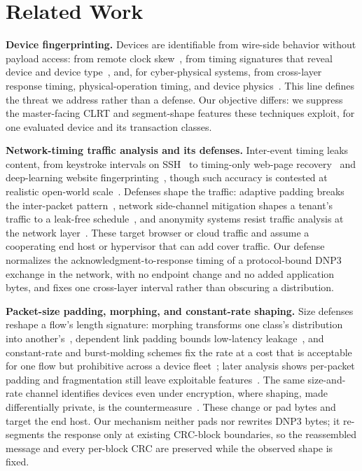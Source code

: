 \section{Related Work}
\label{sec:related}

\noindent\textbf{Device fingerprinting.} Devices are identifiable from wire-side behavior without
payload access: from remote clock skew~\cite{kohno2005}, from timing signatures that reveal device and
device type~\cite{gtid2015}, and, for cyber-physical systems, from cross-layer response timing,
physical-operation timing, and device physics~\cite{formby2016,gu2018}. This line defines the threat
we address rather than a defense. Our objective differs: we suppress the master-facing CLRT and
segment-shape features these techniques exploit, for one evaluated device and its transaction classes.

\noindent\textbf{Network-timing traffic analysis and its defenses.} Inter-event timing leaks content,
from keystroke intervals on SSH~\cite{song2001} to timing-only web-page recovery~\cite{feghhi2016} and
deep-learning website fingerprinting~\cite{sirinam2018}, though such accuracy is contested at realistic
open-world scale~\cite{panchenko2016}. Defenses shape the traffic: adaptive padding breaks the
inter-packet pattern~\cite{juarez2016}, network side-channel mitigation shapes a tenant's
traffic to a leak-free schedule~\cite{pacer2022}, and anonymity systems resist traffic analysis at the
network layer~\cite{hornet2015,taranet2018}. These target browser or cloud traffic and assume a
cooperating end host or hypervisor that can add cover traffic. Our defense normalizes the
acknowledgment-to-response timing of a protocol-bound DNP3 exchange in the network, with no endpoint
change and no added application bytes, and fixes one cross-layer interval rather than obscuring a
distribution.

\noindent\textbf{Packet-size padding, morphing, and constant-rate shaping.} Size defenses reshape a
flow's length signature: morphing transforms one class's distribution into another's~\cite{wright2009},
dependent link padding bounds low-latency leakage~\cite{wang2008dlp}, and constant-rate and
burst-molding schemes fix the rate at a cost that is acceptable for one flow but prohibitive across a
device fleet~\cite{tamaraw2014,walkietalkie2017}; later analysis shows per-packet padding and
fragmentation still leave exploitable features~\cite{dyer2012}. The same size-and-rate channel
identifies devices even under encryption, where shaping, made differentially private, is the
countermeasure~\cite{apthorpe2019,netshaper2024}. These change or pad bytes and target the end host.
Our mechanism neither pads nor rewrites DNP3 bytes; it re-segments the response only at existing
CRC-block boundaries, so the reassembled message and every per-block CRC are preserved while the
observed shape is fixed.

